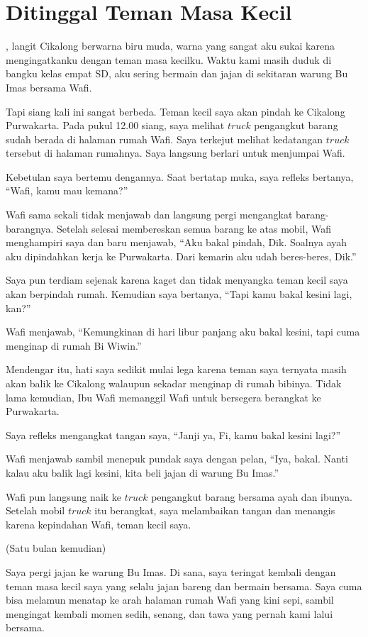 \chapter*{Ditinggal Teman Masa Kecil}

, langit Cikalong berwarna biru muda, warna yang sangat aku sukai karena mengingatkanku dengan teman masa kecilku. Waktu kami masih duduk di bangku kelas empat SD, aku sering bermain dan jajan di sekitaran warung Bu Imas bersama Wafi. 

Tapi siang kali ini sangat berbeda. Teman kecil saya akan pindah ke Cikalong Purwakarta. Pada pukul 12.00 siang, saya melihat \(\textit{truck}\) pengangkut barang sudah berada di halaman rumah Wafi. Saya terkejut melihat kedatangan \(\textit{truck}\) tersebut di halaman rumahnya. Saya langsung berlari untuk menjumpai Wafi. 

Kebetulan saya bertemu dengannya. Saat bertatap muka, saya refleks bertanya, ``Wafi, kamu mau kemana?'' 

Wafi sama sekali tidak menjawab dan langsung pergi mengangkat barang-barangnya. Setelah selesai membereskan semua barang ke atas mobil, Wafi menghampiri saya dan baru menjawab, ``Aku bakal pindah, Dik. Soalnya ayah aku dipindahkan kerja ke Purwakarta. Dari kemarin aku udah beres-beres, Dik.'' 

Saya pun terdiam sejenak karena kaget dan tidak menyangka teman kecil saya akan berpindah rumah. Kemudian saya bertanya, ``Tapi kamu bakal kesini lagi, kan?'' 

Wafi menjawab, ``Kemungkinan di hari libur panjang aku bakal kesini, tapi cuma menginap di rumah Bi Wiwin.'' 

Mendengar itu, hati saya sedikit mulai lega karena teman saya ternyata masih akan balik ke Cikalong walaupun sekadar menginap di rumah bibinya. Tidak lama kemudian, Ibu Wafi memanggil Wafi untuk bersegera berangkat ke Purwakarta. 

Saya refleks mengangkat tangan saya, ``Janji ya, Fi, kamu bakal kesini lagi?'' 

Wafi menjawab sambil menepuk pundak saya dengan pelan, ``Iya, bakal. Nanti kalau aku balik lagi kesini, kita beli jajan di warung Bu Imas.'' 

Wafi pun langsung naik ke \(\textit{truck}\) pengangkut barang bersama ayah dan ibunya. Setelah mobil \(\textit{truck}\) itu berangkat, saya melambaikan tangan dan menangis karena kepindahan Wafi, teman kecil saya.

(Satu bulan kemudian)

Saya pergi jajan ke warung Bu Imas. Di sana, saya teringat kembali dengan teman masa kecil saya yang selalu jajan bareng dan bermain bersama. Saya cuma bisa melamun menatap ke arah halaman rumah Wafi yang kini sepi, sambil mengingat kembali momen sedih, senang, dan tawa yang pernah kami lalui bersama.

\jedahias
